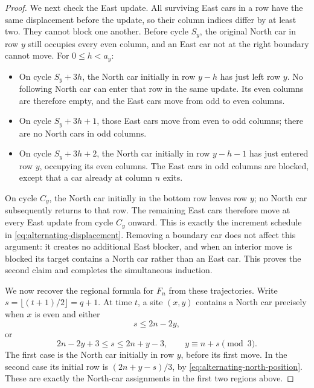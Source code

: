 \documentclass[reqno]{amsart}
\begin{document}
\begin{proof}
We next check the East update. All surviving East cars in a row have
the same displacement before the update, so their column indices differ
by at least two. They cannot block one another. Before cycle $S_y$, the
original North car in row $y$ still occupies every even column, and an
East car not at the right boundary cannot move. For $0\leq h<a_y$:
\begin{itemize}
\item On cycle $S_y+3h$, the North car initially in row $y-h$ has just
left row $y$. No following North car can enter that row in the same
update. Its even columns are therefore empty, and the East cars move
from odd to even columns.
\item On cycle $S_y+3h+1$, those East cars move from even to odd columns;
there are no North cars in odd columns.
\item On cycle $S_y+3h+2$, the North car initially in row $y-h-1$ has
just entered row $y$, occupying its even columns. The East cars in odd
columns are blocked, except that a car already at column $n$ exits.
\end{itemize}
On cycle $C_y$, the North car initially in the bottom row leaves row
$y$; no North car subsequently returns to that row. The remaining East
cars therefore move at every East update from cycle $C_y$ onward.
This is exactly the increment schedule in
\eqref{eq:alternating-displacement}. Removing a boundary car does not
affect this argument: it creates no additional East blocker, and when
an interior move is blocked its target contains a North car rather
than an East car. This proves the second claim and completes the
simultaneous induction.

We now recover the regional formula for $F_n$ from these trajectories.
Write $s=\lfloor(t+1)/2\rfloor=q+1$. At time $t$, a site $(x,y)$
contains a North car precisely when $x$ is even and either
\[
 s\leq2n-2y,
\]
or
\[
 2n-2y+3\leq s\leq2n+y-3,\qquad y\equiv n+s\pmod3.
\]
The first case is the North car initially in row $y$, before its first
move. In the second case its initial row is $(2n+y-s)/3$, by
\eqref{eq:alternating-north-position}. These are exactly the North-car
assignments in the first two regions above.


\end{proof}
\end{document}
